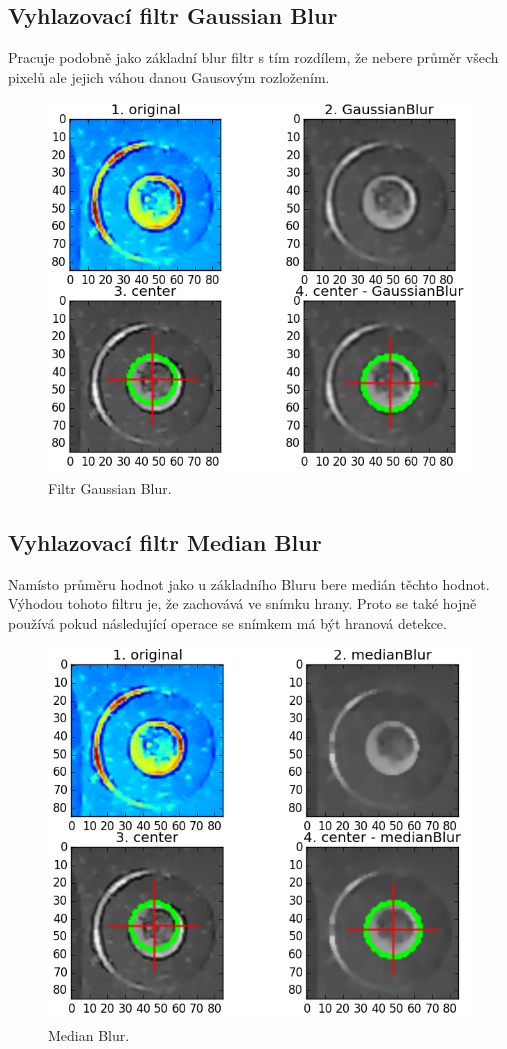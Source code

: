 \subsection{Vyhlazovací filtr Gaussian Blur}
Pracuje podobně jako základní blur filtr s tím rozdílem, že nebere průměr všech pixelů ale jejich váhou danou Gausovým rozložením. 
\begin{figure}[H]
  \centering
    \includegraphics[width=0.8\linewidth]{obrazky/gaussianBlur.png}%
    \caption{Filtr Gaussian Blur.}
    \label{fig:gaussianBlur}
\end{figure}

\subsection{Vyhlazovací filtr Median Blur}

Namísto průměru hodnot jako u základního Bluru bere medián těchto hodnot. Výhodou tohoto filtru je, že zachovává ve snímku hrany. Proto se také hojně používá pokud následující operace se snímkem má být hranová detekce. 

\begin{figure}[H]
  \centering
    \includegraphics[width=0.8\linewidth]{obrazky/medianBlur.png}%
    \caption{Median Blur.}
    \label{fig:medianBlur}
\end{figure}

